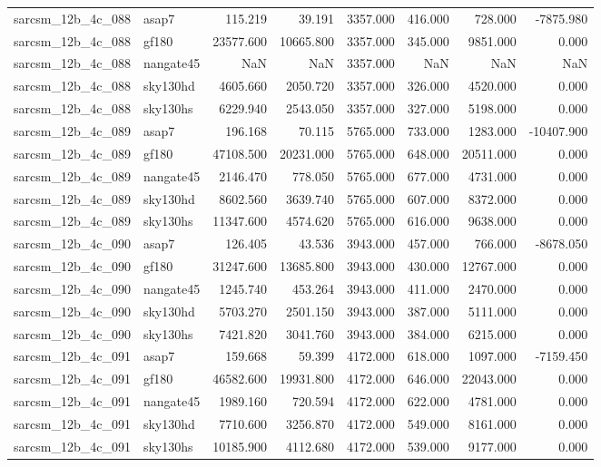 \begin{tabular}{llrrrrrr}
sarcsm\_12b\_4c\_088 & asap7 & 115.219 & 39.191 & 3357.000 & 416.000 & 728.000 & -7875.980 \\
sarcsm\_12b\_4c\_088 & gf180 & 23577.600 & 10665.800 & 3357.000 & 345.000 & 9851.000 & 0.000 \\
sarcsm\_12b\_4c\_088 & nangate45 & NaN & NaN & 3357.000 & NaN & NaN & NaN \\
sarcsm\_12b\_4c\_088 & sky130hd & 4605.660 & 2050.720 & 3357.000 & 326.000 & 4520.000 & 0.000 \\
sarcsm\_12b\_4c\_088 & sky130hs & 6229.940 & 2543.050 & 3357.000 & 327.000 & 5198.000 & 0.000 \\
sarcsm\_12b\_4c\_089 & asap7 & 196.168 & 70.115 & 5765.000 & 733.000 & 1283.000 & -10407.900 \\
sarcsm\_12b\_4c\_089 & gf180 & 47108.500 & 20231.000 & 5765.000 & 648.000 & 20511.000 & 0.000 \\
sarcsm\_12b\_4c\_089 & nangate45 & 2146.470 & 778.050 & 5765.000 & 677.000 & 4731.000 & 0.000 \\
sarcsm\_12b\_4c\_089 & sky130hd & 8602.560 & 3639.740 & 5765.000 & 607.000 & 8372.000 & 0.000 \\
sarcsm\_12b\_4c\_089 & sky130hs & 11347.600 & 4574.620 & 5765.000 & 616.000 & 9638.000 & 0.000 \\
sarcsm\_12b\_4c\_090 & asap7 & 126.405 & 43.536 & 3943.000 & 457.000 & 766.000 & -8678.050 \\
sarcsm\_12b\_4c\_090 & gf180 & 31247.600 & 13685.800 & 3943.000 & 430.000 & 12767.000 & 0.000 \\
sarcsm\_12b\_4c\_090 & nangate45 & 1245.740 & 453.264 & 3943.000 & 411.000 & 2470.000 & 0.000 \\
sarcsm\_12b\_4c\_090 & sky130hd & 5703.270 & 2501.150 & 3943.000 & 387.000 & 5111.000 & 0.000 \\
sarcsm\_12b\_4c\_090 & sky130hs & 7421.820 & 3041.760 & 3943.000 & 384.000 & 6215.000 & 0.000 \\
sarcsm\_12b\_4c\_091 & asap7 & 159.668 & 59.399 & 4172.000 & 618.000 & 1097.000 & -7159.450 \\
sarcsm\_12b\_4c\_091 & gf180 & 46582.600 & 19931.800 & 4172.000 & 646.000 & 22043.000 & 0.000 \\
sarcsm\_12b\_4c\_091 & nangate45 & 1989.160 & 720.594 & 4172.000 & 622.000 & 4781.000 & 0.000 \\
sarcsm\_12b\_4c\_091 & sky130hd & 7710.600 & 3256.870 & 4172.000 & 549.000 & 8161.000 & 0.000 \\
sarcsm\_12b\_4c\_091 & sky130hs & 10185.900 & 4112.680 & 4172.000 & 539.000 & 9177.000 & 0.000 \\

\end{tabular}
